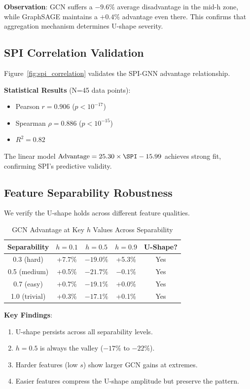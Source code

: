 \textbf{Observation}: GCN suffers a $-9.6\%$ average disadvantage in the mid-h zone, while GraphSAGE maintains a $+0.4\%$ advantage even there. This confirms that aggregation mechanism determines U-shape severity.

\subsection{SPI Correlation Validation}

Figure~\ref{fig:spi_correlation} validates the SPI-GNN advantage relationship.

\textbf{Statistical Results} (N=45 data points):
\begin{itemize}
    \item Pearson $r = 0.906$ ($p < 10^{-17}$)
    \item Spearman $\rho = 0.886$ ($p < 10^{-15}$)
    \item $R^2 = 0.82$
\end{itemize}

The linear model $\text{Advantage} = 25.30 \times \SPI - 15.99$ achieves strong fit, confirming SPI's predictive validity.

\subsection{Feature Separability Robustness}

We verify the U-shape holds across different feature qualities.

\begin{table}[t]
\centering
\caption{GCN Advantage at Key $h$ Values Across Separability}
\label{tab:separability}
\begin{tabular}{@{}ccccc@{}}
\toprule
Separability & $h=0.1$ & $h=0.5$ & $h=0.9$ & U-Shape? \\
\midrule
0.3 (hard) & +7.7\% & $-19.0\%$ & +5.3\% & Yes \\
0.5 (medium) & +0.5\% & $-21.7\%$ & $-0.1\%$ & Yes \\
0.7 (easy) & +0.7\% & $-19.1\%$ & +0.0\% & Yes \\
1.0 (trivial) & +0.3\% & $-17.1\%$ & +0.1\% & Yes \\
\bottomrule
\end{tabular}
\end{table}

\textbf{Key Findings}:
\begin{enumerate}
    \item U-shape persists across all separability levels.
    \item $h=0.5$ is always the valley ($-17\%$ to $-22\%$).
    \item Harder features (low $s$) show larger GCN gains at extremes.
    \item Easier features compress the U-shape amplitude but preserve the pattern.
\end{enumerate}

